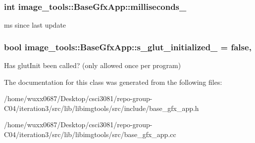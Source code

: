 \subsubsection[{\texorpdfstring{milliseconds\+\_\+}{milliseconds_}}]{\setlength{\rightskip}{0pt plus 5cm}int image\+\_\+tools\+::\+Base\+Gfx\+App\+::milliseconds\+\_\+\hspace{0.3cm}{\ttfamily [private]}}\hypertarget{classimage__tools_1_1BaseGfxApp_a2197d887035883be911d1ced510d99d9}{}\label{classimage__tools_1_1BaseGfxApp_a2197d887035883be911d1ced510d99d9}
ms since last update 
\subsubsection[{\texorpdfstring{s\+\_\+glut\+\_\+initialized\+\_\+}{s_glut_initialized_}}]{\setlength{\rightskip}{0pt plus 5cm}bool image\+\_\+tools\+::\+Base\+Gfx\+App\+::s\+\_\+glut\+\_\+initialized\+\_\+ = false\hspace{0.3cm}{\ttfamily [static]}, {\ttfamily [private]}}\hypertarget{classimage__tools_1_1BaseGfxApp_a4bfe294b3c2987edd8e8465e4047a064}{}\label{classimage__tools_1_1BaseGfxApp_a4bfe294b3c2987edd8e8465e4047a064}
Has glut\+Init been called? (only allowed once per program) 

The documentation for this class was generated from the following files\+:\begin{DoxyCompactItemize}
\item 
/home/wuxx0687/\+Desktop/csci3081/repo-\/group-\/\+C04/iteration3/src/lib/libimgtools/src/include/base\+\_\+gfx\+\_\+app.\+h\item 
/home/wuxx0687/\+Desktop/csci3081/repo-\/group-\/\+C04/iteration3/src/lib/libimgtools/src/base\+\_\+gfx\+\_\+app.\+cc\end{DoxyCompactItemize}
